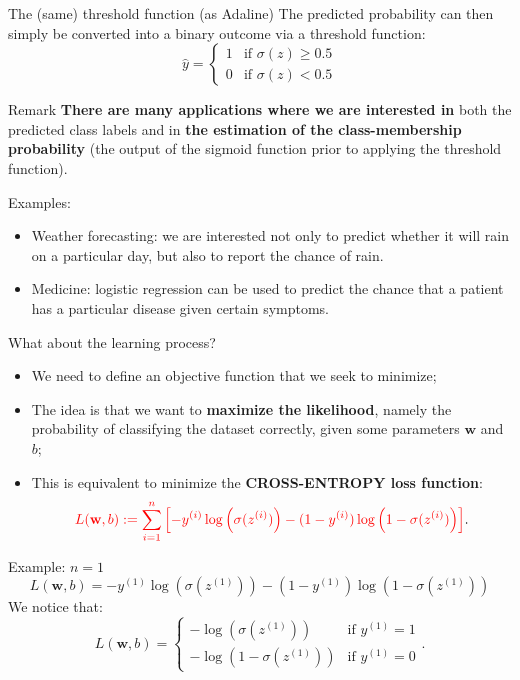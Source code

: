 \documentclass[aspectratio=169]{beamer}
\newcommand{\high}[1]{{\color{red}#1}}
\begin{document}
\begin{frame}{The (same) threshold function (as Adaline)}
The predicted probability can then simply be converted into a binary outcome via a threshold function:
\begin{equation*}
\hat{y}=	\begin{cases}
		1 & \mbox{if } \sigma(z) \ge 0.5\\
		0 & \mbox{if } \sigma(z) < 0.5
	\end{cases}
\end{equation*}

\begin{block}{Remark}
	\textbf{There are many applications where we are interested in} both the predicted class labels and in \textbf{the estimation of the class-membership probability} (the output of the sigmoid function prior to applying the threshold function). 
\end{block}
Examples:
\begin{itemize}
	\item Weather forecasting: we are interested not only to predict whether it will rain on a particular day, but also to report the chance of rain. 
	\item Medicine: logistic regression can be used to predict the chance that a patient has a particular disease given certain symptoms.
\end{itemize}
\end{frame}

\begin{frame}{What about the learning process?}
	\begin{itemize}
		\item We need to define an objective function that we seek to minimize;
		\item The idea is that we want to \textbf{maximize the likelihood}, namely the probability of classifying the dataset correctly, given some parameters $\mathbf{w}$ and  $b$;
		\item This is equivalent to minimize the \textbf{CROSS-ENTROPY loss function}:
		\begin{equation*}
			\high{L(\mathbf{w}, b) := \sum_{i=1}^{n} \left[  -y^{(i)}\log\left(\sigma(z^{(i)})\right) - (1-y^{(i)})\log\left(1-\sigma(z^{(i)})\right)\right]}.
		\end{equation*}
	\end{itemize}

Example: $n=1$
	\begin{equation*}
		L(\mathbf{w}, b) = -y^{(1)}\log\left(\sigma(z^{(1)})\right) - (1-y^{(1)})\log\left(1-\sigma(z^{(1)})\right)
	\end{equation*}
We notice that:
\begin{equation*}
	L(\mathbf{w}, b)  = \begin{cases}
		-\log\left(\sigma(z^{(1)})\right) & \mbox{if } y^{(1)} = 1\\
		-\log\left(1-\sigma(z^{(1)})\right)& \mbox{if } y^{(1)} = 0
	\end{cases}.
\end{equation*}
	
\end{frame}
\end{document}

